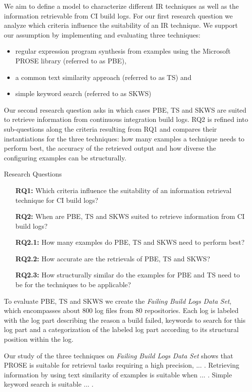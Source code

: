 \documentclass[\myrootdir/main.tex]{subfiles}
\begin{document}
We aim to define a model to characterize different IR techniques as well as the information retrievable from CI build logs.
For our first research question we analyze which criteria influence the suitability of an IR technique.
We support our assumption by implementing and evaluating three techniques:
\begin{itemize}
  \item regular expression program synthesis from examples using the Microsoft PROSE library (referred to as PBE),
  \item a common text similarity approach (referred to as TS) and
  \item simple keyword search (referred to as SKWS)
\end{itemize}
Our second research question asks in which cases PBE, TS and SKWS are suited to retrieve information from continuous integration build logs. RQ2 is refined into sub-questions along the criteria resulting from RQ1 and compares their instantiations for the three techniques: how many examples a technique needs to perform best, the accuracy of the retrieved output and how diverse the configuring examples can be structurally.
\begin{simplebox}{Research Questions}
\begin{itemize}
  \item[\textbf{RQ1:}] Which criteria influence the suitability of an information retrieval technique for CI build logs?
  \item[\textbf{RQ2:}] When are PBE, TS and SKWS suited to retrieve information from CI build logs?
  \item[\textbf{RQ2.1:}] How many examples do PBE, TS and SKWS need to perform best?
  \item[\textbf{RQ2.2:}] How accurate are the retrievals of PBE, TS and SKWS?
  \item[\textbf{RQ2.3:}] How structurally similar do the examples for PBE and TS need to be for the techniques to be applicable?
\end{itemize}
\end{simplebox}
To evaluate PBE, TS and SKWS we create the \emph{Failing Build Logs Data Set}, which encompasses about 800 log files from 80 repositories. Each log is labeled with the log part describing the reason a build failed, keywords to search for this log part and a categorization of the labeled log part according to its structural position within the log. 



Our study of the three techniques on \emph{Failing Build Logs Data Set} shows that PROSE is suitable for retrieval tasks requiring a high precision, ... . Retrieving information by using text similarity of examples is suitable when ... . Simple keyword search is suitable ... .
\end{document}

